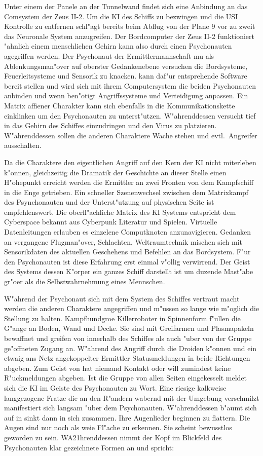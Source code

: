 Unter einem der Panele an der Tunnelwand findet sich eine Anbindung an das Comsystem der Zeus II-2. Um die KI des Schiffs zu bezwingen und die USI Kontrolle zu entfernen schl"agt \xl{} bereits beim Abflug von der Plane 9 vor zu zweit das Neuronale System anzugreifen. Der Bordcomputer der Zeus II-2 funktioniert "ahnlich einem menschlichen Gehirn kann also durch einen Psychonauten agegriffen werden. Der Psychonaut der Ermittlermannschaft mu\3 als Ablenkungsman"over auf oberster Gedankenebene versuchen die Bordsysteme, Feuerleitsysteme und Sensorik zu knacken. \ml{} kann daf"ur entsprehende Software bereit stellen und wird sich mit ihrem Computersystem die beiden Psychonauten anbinden und wenn ben"otigt Angriffssysteme und Verteidigung anpassen. Ein Matrix affiener Charakter kann sich ebenfalls in die Kommunikationskette einklinken um den Psychonauten zu unterst"utzen. W"ahrenddessen versucht \xl{} tief in das Gehirn des Schiffes einzudringen und den Virus zu platzieren. W"ahrenddessen sollen die anderen Charaktere Wache stehen und evtl.~Angreifer ausschalten.

Da die Charaktere den eigentlichen Angriff auf den Kern der KI nicht miterleben k"onnen, gleichzeitig die Dramatik der Geschichte an dieser Stelle einen H"ohepunkt erreicht werden die Ermittler an zwei Fronten von dem Kampfschiff in die Enge getrieben. Ein schneller Szenenwechsel zwischen dem Matrixkampf des Psynchonauten und der Unterst"utzung auf physischen Seite ist empfehlenswert. Die oberfl"achliche Matrix des KI Systems entspricht dem Cyberspace bekannt aus Cyberpunk Literatur und Spielen. Virtuelle Datenleitungen erlauben es einzelene Computknoten anzunavigieren. Gedanken an vergangene Flugman"over, Schlachten, Weltraumtechnik mischen sich mit Sensorikdaten des aktuellen Geschehens und Befehlen an das Bordsystem. F"ur den Psychonauten ist diese Erfahrung erst einmal v"ollig verwirrend. Der Geist des Systems dessen K"orper ein ganzes Schiff darstellt ist um duzende Ma\3st"abe gr"o\3er als die Selbstwahrnehmung eines Mennschen.

W"ahrend der Psychonaut sich mit dem System des Schiffes vertraut macht werden die anderen Charaktere angegriffen und m"ussen so lange wie m"oglich die Stellung zu halten. Kampfhundgro\3e Killerroboter in Spinnenform f"ullen die G"ange an Boden, Wand und Decke. Sie sind mit Greifarmen und Plasmapakeln bewaffnet und greifen von innerhalb des Schiffes als auch "uber von der Gruppe ge"offneten Zugang an. W"ahrend des Angriff durch die Droiden k"onnen \ml{} und ein etwaig ans Netz angekoppelter Ermittler Statusmeldungen in beide Richtungen abgeben. Zum Geist von \xl{} hat niemand Kontakt oder \ml{} will zumindest keine R"uckmeldungen abgeben. Ist die Gruppe von allen Seiten eingekesselt meldet sich die KI im Geiste des Psychonauten zu Wort. Eine riesige kalkweise langgezogene Fratze die an den R"andern wabernd mit der Umgebung verschmilzt manifestiert sich langsam "uber dem Psychonauten. W"ahrenddessen b"aumt sich \xl{} auf in sinkt dann in sich zusammen. Ihre Augenlieder beginnen zu flattern. Die Augen sind nur noch als wei\3e Fl"ache zu erkennen. Sie scheint bewusstlos geworden zu sein. WA21hrenddessen nimmt der Kopf im Blickfeld des Psychonauten klar gezeichnete Formen an und spricht:

